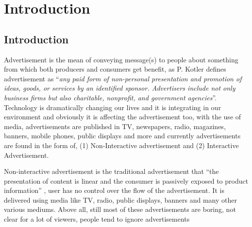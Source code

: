 
\chapter{Introduction} %

\label{Chapter1} %
\newpage



\section{Introduction}
Advertisement is the mean of conveying message(s) to people about something from which both producers and consumers get benefit, as P. Kotler \cite{ad_def} defines advertisement as ``\emph{any paid form of non-personal presentation and promotion of ideas, goods, or services by an identified sponsor. Advertisers include not only business firms but also charitable, nonprofit, and government agencies}''. Technology is dramatically changing our lives and it is integrating in our environment and obviously it is affecting the advertisement too, with the use of media, advertisements are published in TV, newspapers, radio, magazines, banners, mobile phones, public displays and more and currently advertisements are found in the form of, (1) Non-Interactive advertisement and (2) Interactive Advertisement.

Non-interactive advertisement is the traditional advertisement that “the presentation of content is linear and the consumer is passively exposed to product information” \cite{Non_inter_vs_interAd}, user has no control over the flow of the advertisement. It is delivered using media like TV, radio, public displays, banners and many other various mediums. Above all, still most of these advertisements are boring, not clear for a lot of viewers, people tend to ignore advertisements \cite{display_blindness, banner_blindness}

